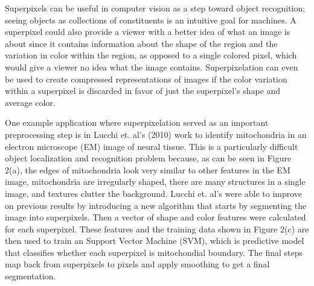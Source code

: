 \documentclass[11pt,twocolumn]{article}
\begin{document}
Superpixels can be useful in computer vision as a step toward object recognition; seeing objects as collections of constituents is an intuitive goal for machines. A superpixel could also provide a viewer with a better idea of what an image is about since it contains information about the shape of the region and the variation in color within the region, as opposed to a single colored pixel, which would give a viewer no idea what the image contains. Superpixelation can even be used to create compressed representations of images if the color variation within a superpixel is discarded in favor of just the superpixel's shape and average color. 

One example application where superpixelation served as an important preprocessing step is in Lucchi et. al's (2010) work \cite{medical} to identify mitochondria in an electron microscope (EM) image of neural tissue. This is a particularly difficult object localization and recognition problem because, as can be seen in Figure 2(a), the edges of mitochondria look very similar to other features in the EM image, mitochondria are irregularly shaped, there are many structures in a single image, and textures clutter the background. Lucchi et. al's were able to improve on previous results by introducing a new algorithm that starts by segmenting the image into superpixels. Then a vector of shape and color features were calculated for each superpixel. These features and the training data shown in Figure 2(c) are then used to train an Support Vector Machine (SVM), which is predictive model that classifies whether each superpixel is mitochondial boundary. The final steps map back from superpixels to pixels and apply smoothing to get a final segmentation.
\end{document}
